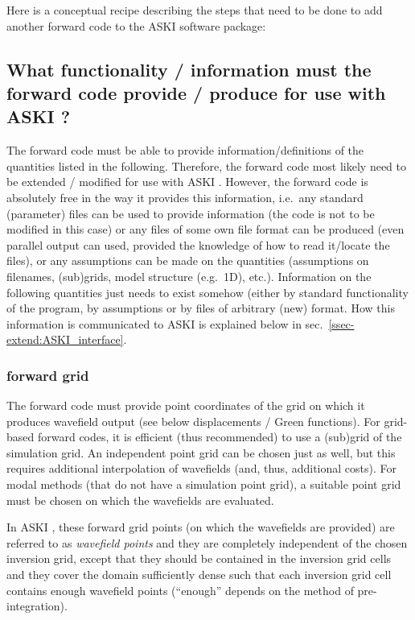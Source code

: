 \documentclass[12pt,a4paper]{article}
\newcommand{\ASKI}{ {\ttfamily ASKI} }
\begin{document}
Here is a conceptual recipe describing the steps that need to be done to add another forward code to the 
ASKI software package:

\subsection{What functionality / information must the forward code provide / produce for use with \ASKI{}?} \label{ssec-extend:forward_output}
The forward code must be able to provide information/definitions of the quantities listed in the following. 
Therefore, the forward code most likely need to be extended / modified for use with \ASKI{}. However, the forward 
code is absolutely free in the way it provides this information, i.e.\ any standard (parameter) files can be
used to provide information (the code is not to be modified in this case) or any files of some own file format 
can be produced (even parallel output can used, provided the knowledge of how to read it/locate the files), 
or any assumptions can be made on the quantities (assumptions on filenames, (sub)grids, model
structure (e.g.\ 1D), etc.). Information on the following quantities just needs to exist somehow (either by
standard functionality of the program, by assumptions or by files of arbitrary (new) format. How this information
is communicated to \ASKI{} is explained below in sec.~\ref{ssec-extend:ASKI_interface}.

\subsubsection{forward grid}
The forward code must provide point coordinates of the grid on which it produces
wavefield output (see below displacements / Green functions). For grid-based forward codes, it is efficient 
(thus recommended) to use a (sub)grid of the simulation grid. An independent point grid can be chosen just as well, 
but this requires additional interpolation of wavefields (and, thus, additional costs). For modal methods (that
do not have a simulation point grid), a suitable point grid must be chosen on which the wavefields are evaluated.

In \ASKI{}, these forward grid points (on which the wavefields are provided) are referred to as \emph{wavefield points}
and they are completely independent of the chosen inversion grid, except that they should be contained in the
inversion grid cells and they cover the domain sufficiently dense such that each inversion grid cell contains
enough wavefield points (``enough'' depends on the method of pre-integration).
\end{document}
